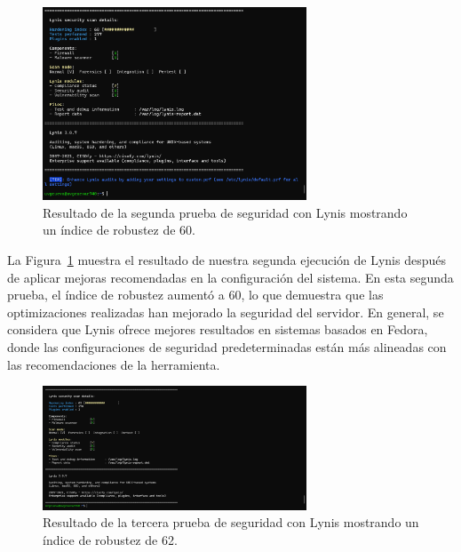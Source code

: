 \begin{figure}[H]
    \centering
    \includegraphics[width=0.7\textwidth]{figuras/segundaPruebaLynis.png}
    \caption{Resultado de la segunda prueba de seguridad con Lynis mostrando un índice de robustez de 60.}
    \label{fig:segundaPruebaLynis}
\end{figure}

La Figura~\ref{fig:segundaPruebaLynis} muestra el resultado de nuestra segunda ejecución de Lynis después de aplicar mejoras recomendadas en la configuración del sistema. En esta segunda prueba, el índice de robustez aumentó a 60, lo que demuestra que las optimizaciones realizadas han mejorado la seguridad del servidor. En general, se considera que Lynis ofrece mejores resultados en sistemas basados en Fedora, donde las configuraciones de seguridad predeterminadas están más alineadas con las recomendaciones de la herramienta.

\begin{figure}[H]
    \centering
    \includegraphics[width=0.7\textwidth]{figuras/terceraPruebaLynis.png}
    \caption{Resultado de la tercera prueba de seguridad con Lynis mostrando un índice de robustez de 62.}
    \label{fig:terceraPruebaLynis}
\end{figure}

